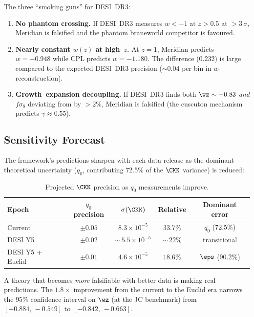 The three ``smoking guns'' for DESI~DR3:
\begin{enumerate}
\item \textbf{No phantom crossing.} If DESI~DR3 measures $w < -1$ at $z > 0.5$ at $> 3\,\sigma$, Meridian is falsified and the phantom braneworld competitor is favoured.
\item \textbf{Nearly constant $w(z)$ at high~$z$.} At $z = 1$, Meridian predicts $w = -0.948$ while CPL predicts $w = -1.180$. The difference (0.232) is large compared to the expected DESI~DR3 precision ($\sim\!0.04$ per bin in $w$-reconstruction).
\item \textbf{Growth--expansion decoupling.} If DESI~DR3 finds both $\wz \sim -0.83$ \emph{and} $f\sigma_8$ deviating from \LCDM{} by $> 2\%$, Meridian is falsified (the cuscuton mechanism predicts $\gamma \approx 0.55$).
\end{enumerate}

\subsection{Sensitivity Forecast}
\label{sec:2-sensitivity-forecast}

The framework's predictions sharpen with each data release as the dominant theoretical uncertainty ($q_0$, contributing 72.5\% of the $\CKK$ variance) is reduced:

\begin{table}[htbp]
\centering
\caption{Projected $\CKK$ precision as $q_0$ measurements improve.}
\label{tab:2-sensitivity}
\begin{tabular}{@{}lcccc@{}}
\toprule
Epoch & $q_0$ precision & $\sigma(\CKK)$ & Relative & Dominant error \\
\midrule
Current & $\pm 0.05$ & $8.3 \times 10^{-5}$ & $33.7\%$ & $q_0$ (72.5\%) \\
DESI Y5 & $\pm 0.02$ & ${\sim}\,5.5 \times 10^{-5}$ & ${\sim}\,22\%$ & transitional \\
DESI Y5 + Euclid & $\pm 0.01$ & $4.6 \times 10^{-5}$ & $18.6\%$ & $\eps$ (90.2\%) \\
\bottomrule
\end{tabular}
\end{table}

A theory that becomes \emph{more} falsifiable with better data is making real predictions. The $1.8\times$ improvement from the current to the Euclid era narrows the $95\%$ confidence interval on $\wz$ (at the JC benchmark) from $[-0.884,\, -0.549]$ to $[-0.842,\, -0.663]$.


